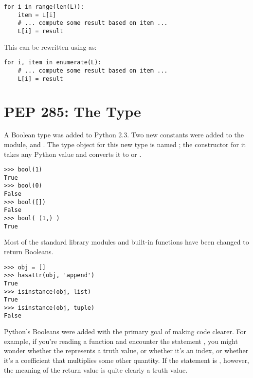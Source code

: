 \documentclass{howto}
\begin{document}
\begin{verbatim}
for i in range(len(L)):
    item = L[i]
    # ... compute some result based on item ...
    L[i] = result
\end{verbatim}

This can be rewritten using  as:

\begin{verbatim}
for i, item in enumerate(L):
    # ... compute some result based on item ...
    L[i] = result
\end{verbatim}


\begin{seealso}


\end{seealso}


\section{PEP 285: The  Type\label{section-bool}}

A Boolean type was added to Python 2.3.  Two new constants were added
to the  module,  and
.  The type object for this new type is named
; the constructor for it takes any Python value and
converts it to  or .

\begin{verbatim}
>>> bool(1)
True
>>> bool(0)
False
>>> bool([])
False
>>> bool( (1,) )
True
\end{verbatim}

Most of the standard library modules and built-in functions have been
changed to return Booleans.

\begin{verbatim}
>>> obj = []
>>> hasattr(obj, 'append')
True
>>> isinstance(obj, list)
True
>>> isinstance(obj, tuple)
False
\end{verbatim}

Python's Booleans were added with the primary goal of making code
clearer.  For example, if you're reading a function and encounter the
statement , you might wonder whether the 
represents a truth value, or whether it's an index, or whether it's a
coefficient that multiplies some other quantity.  If the statement is
, however, the meaning of the return value is quite
clearly a truth value.
\end{document}
